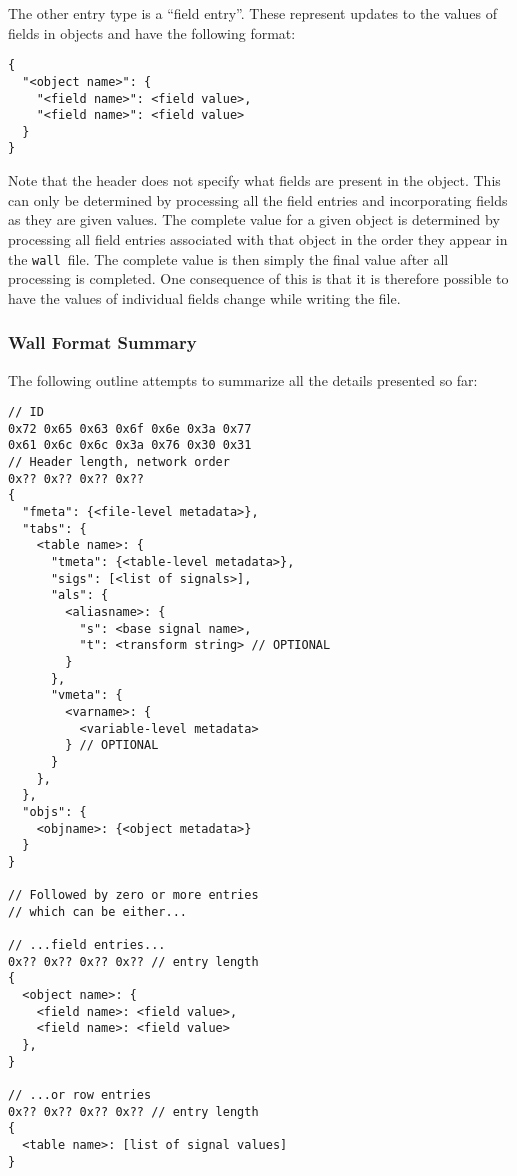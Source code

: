 \documentclass[11pt,a4paper,twocolumn]{article}
\newcommand{\wall}{\texttt{wall}}
\begin{document}
The other entry type is a ``field entry''.  These represent updates to
the values of fields in objects and have the following format:

\begin{verbatim}
{
  "<object name>": {
    "<field name>": <field value>,
    "<field name>": <field value>
  }
}
\end{verbatim}

Note that the header does not specify what fields are present in the
object.  This can only be determined by processing all the field
entries and incorporating fields as they are given values.  The
complete value for a given object is determined by processing all
field entries associated with that object in the order they appear in
the \wall\ file.  The complete value is then simply the final value
after all processing is completed.  One consequence of this is that it
is therefore possible to have the values of individual fields change
while writing the file.

\subsubsection{Wall Format Summary}


The following outline attempts to summarize all the details presented so
far:

\begin{verbatim}
// ID
0x72 0x65 0x63 0x6f 0x6e 0x3a 0x77
0x61 0x6c 0x6c 0x3a 0x76 0x30 0x31
// Header length, network order
0x?? 0x?? 0x?? 0x??
{
  "fmeta": {<file-level metadata>},
  "tabs": {
    <table name>: {
      "tmeta": {<table-level metadata>},
      "sigs": [<list of signals>],
      "als": {
        <aliasname>: {
          "s": <base signal name>,
          "t": <transform string> // OPTIONAL
        }
      },
      "vmeta": {
        <varname>: {
          <variable-level metadata>
        } // OPTIONAL
      }
    },
  },
  "objs": {
    <objname>: {<object metadata>}
  }
}

// Followed by zero or more entries
// which can be either...

// ...field entries...
0x?? 0x?? 0x?? 0x?? // entry length
{
  <object name>: {
    <field name>: <field value>,
    <field name>: <field value>
  },
}

// ...or row entries
0x?? 0x?? 0x?? 0x?? // entry length
{
  <table name>: [list of signal values]  
}
\end{verbatim}
\end{document}
